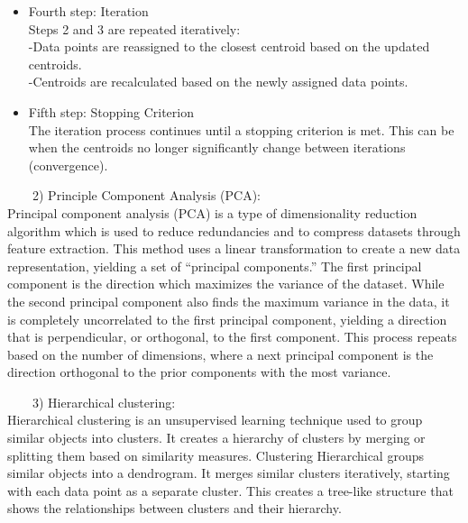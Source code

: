 \documentclass[
]{book}
\begin{document}
\begin{itemize}
\item
  Fourth step: Iteration\\
  Steps 2 and 3 are repeated iteratively:\\
  \hspace*{0.333em}\hspace*{0.333em}\hspace*{0.333em}\hspace*{0.333em}-Data points are reassigned to the closest centroid based on the updated centroids.\\
  \hspace*{0.333em}\hspace*{0.333em}\hspace*{0.333em}\hspace*{0.333em}-Centroids are recalculated based on the newly assigned data points.
\item
  Fifth step: Stopping Criterion\\
  The iteration process continues until a stopping criterion is met. This can be when the centroids no longer significantly change between iterations (convergence).
\end{itemize}

~~~~2) Principle Component Analysis (PCA):\\
Principal component analysis (PCA) is a type of dimensionality reduction algorithm which is used to reduce redundancies and to compress datasets through feature extraction. This method uses a linear transformation to create a new data representation, yielding a set of ``principal components.'' The first principal component is the direction which maximizes the variance of the dataset. While the second principal component also finds the maximum variance in the data, it is completely uncorrelated to the first principal component, yielding a direction that is perpendicular, or orthogonal, to the first component. This process repeats based on the number of dimensions, where a next principal component is the direction orthogonal to the prior components with the most variance.

~~~~3) Hierarchical clustering:\\
Hierarchical clustering is an unsupervised learning technique used to group similar objects into clusters. It creates a hierarchy of clusters by merging or splitting them based on similarity measures.
Clustering Hierarchical groups similar objects into a dendrogram. It merges similar clusters iteratively, starting with each data point as a separate cluster. This creates a tree-like structure that shows the relationships between clusters and their hierarchy.
\end{document}
